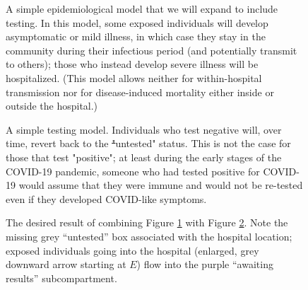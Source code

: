 \documentclass[pdflatex,sn-basic]{sn-jnl}%
\theoremstyle{definition}
\providecommand{\DIFadd}[1]{{\protect\color{blue}\uwave{#1}}} %
\providecommand{\DIFdel}[1]{{\protect\color{red}\sout{#1}}}                      %
\providecommand{\DIFaddFL}[1]{\DIFadd{#1}} %
\providecommand{\DIFdelFL}[1]{\DIFdel{#1}} %
\providecommand{\DIFaddbeginFL}{} %
\providecommand{\DIFaddendFL}{} %
\providecommand{\DIFdelbeginFL}{} %
\providecommand{\DIFdelendFL}{} %
\newcommand{\DIFscaledelfig}{0.5}
\newlength{\DIFdelgraphicswidth} %
\newlength{\DIFdelgraphicsheight} %
\newcommand{\DIFaddincludegraphics}[2][]{{\color{blue}\fbox{\DIFOincludegraphics[#1]{#2}}}} %
\newcommand{\DIFdelincludegraphics}[2][]{%
\sbox{\DIFdelgraphicsbox}{\DIFOincludegraphics[#1]{#2}}%
\settoboxwidth{\DIFdelgraphicswidth}{\DIFdelgraphicsbox} %
\settoboxtotalheight{\DIFdelgraphicsheight}{\DIFdelgraphicsbox} %
\scalebox{\DIFscaledelfig}{%
\parbox[b]{\DIFdelgraphicswidth}{\usebox{\DIFdelgraphicsbox}\\[-\baselineskip] \rule{\DIFdelgraphicswidth}{0em}}\llap{\resizebox{\DIFdelgraphicswidth}{\DIFdelgraphicsheight}{%
\setlength{\unitlength}{\DIFdelgraphicswidth}%
\begin{picture}(1,1)%
\thicklines\linethickness{2pt} %
{\color[rgb]{1,0,0}\put(0,0){\framebox(1,1){}}}%
{\color[rgb]{1,0,0}\put(0,0){\line( 1,1){1}}}%
{\color[rgb]{1,0,0}\put(0,1){\line(1,-1){1}}}%
\end{picture}%
}\hspace*{3pt}}} %
} %
\DeclareRobustCommand{\DIFaddbeginFL}{\DIFOaddbeginFL \let\includegraphics\DIFaddincludegraphics} %
\DeclareRobustCommand{\DIFaddendFL}{\DIFOaddendFL \let\includegraphics\DIFOincludegraphics} %
\DeclareRobustCommand{\DIFdelbeginFL}{\DIFOdelbeginFL \let\includegraphics\DIFdelincludegraphics} %
\DeclareRobustCommand{\DIFdelendFL}{\DIFOaddendFL \let\includegraphics\DIFOincludegraphics} %
\begin{document}
\begin{figure}
    \centering
    
    \caption{A simple epidemiological model that we will expand to include testing. In this model, some exposed individuals will develop asymptomatic or mild illness, in which case they stay in the community during their infectious period (and potentially transmit to others); those who instead develop severe illness will be hospitalized. (This model allows neither for within-hospital transmission nor for disease-induced mortality either inside or outside the hospital.)}
    \label{fig:testify_epi}
\end{figure}

\begin{figure}
    \centering
    
    \caption{A simple testing model. Individuals who test negative will, over time, revert back to the \DIFdelbeginFL \DIFdelFL{"}\DIFdelendFL \DIFaddbeginFL \DIFaddFL{“}\DIFaddendFL untested" status. This is not the case for those that test "positive"; at least during the early stages of the COVID-19 pandemic, someone who had tested positive for COVID-19 would assume that they were immune and would not be re-tested even if they developed COVID-like symptoms.}
    \label{fig:testify_states}
\end{figure}

\begin{figure}
    \centering
    
    \caption{The desired result of combining Figure \ref{fig:testify_epi} with Figure \ref{fig:testify_states}. Note the missing grey ``untested'' box associated with the hospital location; exposed individuals going into the hospital (enlarged, grey downward arrow starting at $E$) flow into the purple ``awaiting results'' subcompartment.}
    \label{fig:testify_desired}
\end{figure}

\FloatBarrier
\end{document}
